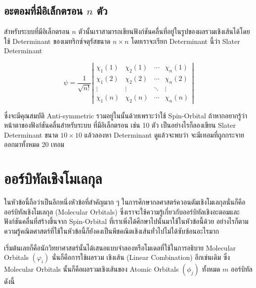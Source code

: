 \subsection{อะตอมที่มีอิเล็กตรอน $n$ ตัว}

สำหรับระบบที่มีอิเล็กตรอน $n$ ตัวนั้นเราสามารถเขียนฟังก์ชันคลื่นที่อยู่ในรูปของผลรวมเชิงเส้นได้โดยใช้ Determinant ของเมทริกซ์จตุรัสขนาด
$n \times n$ โดยเราจะเรียก Determinant นี้ว่า Slater Determinant

\begin{equation}
  \label{eq:Slater_determinant}
  \psi =
  \frac{1}{\sqrt{n !}}
  \left|
  \begin{array}{cccc}
    \chi_1(1) & \chi_2(1) & \cdots & \chi_n(1) \\
    \chi_1(2) & \chi_2(2) & \cdots & \chi_n(2) \\
    \vdots    & \vdots    & \ddots & \vdots    \\
    \chi_1(n) & \chi_2(n) & \cdots & \chi_n(n)
  \end{array}
  \right|
\end{equation}

\noindent ซึ่งจะมีคุณสมบัติ Anti-symmetric รวมอยู่ในนั้นด้วยเพราะว่าใช้ Spin-Orbital ถ้าหากอยากรู้ว่าหน้าตาของฟังก์ชันคลื่นสำหรับระบบ%
ที่มีอิเล็กตรอน เช่น 10 ตัว เป็นอย่างไรก็ลองเขียน Slater Determinant ขนาด $10 \times 10$ แล้วลองหา Determinant ดูแล้วจะพบว่า%
จะมีเทอมที่ถูกกระจายออกมาทั้งหมด 20 เทอม

\section{ออร์บิทัลเชิงโมเลกุล}

ในหัวข้อนี้ถือว่าเป็นอีกหนึ่งหัวข้อที่สำคัญมาก ๆ ในการศึกษากลศาสตร์ควอนตัมเชิงโมเลกุลนั่นก็คือออร์บิทัลเชิงโมเลกุล (Molecular Orbitals)
ซึ่งเราจะใช้ความรู้เกี่ยวกับออร์บิทัลเชิงอะตอมและฟังก์ชันคลื่นที่สร้างขึ้นจาก Spin-Orbital ที่เราเพิ่งได้ศึกษาไปนั้นมาใช้ในหัวข้อนี้ด้วย
อย่างไรก็ตาม ความรู้คณิตศาสตร์ที่ใช้ในหัวข้อนี้ก็ยังคงเป็นพีชคณิตเชิงเส้นทั่วไปไม่ได้ซับซ้อนอะไรมาก

เริ่มต้นเลยก็คือนักวิทยาศาสตร์นั้นได้เสนอแบบจำลองหรือโมเดลที่ใช้ในการอธิบาย Molecular Orbitals $(\varphi_i)$ นั่นก็คือการใช้ผลรวม%
เชิงเส้น (Linear Combination) อีกเช่นเดิม ซึ่ง Molecular Orbitals นั้นก็คือผลรวมเชิงเส้นของ Atomic Orbitals $(\phi_j)$ ทั้งหมด
$m$ ออร์บิทัล ดังนี้

